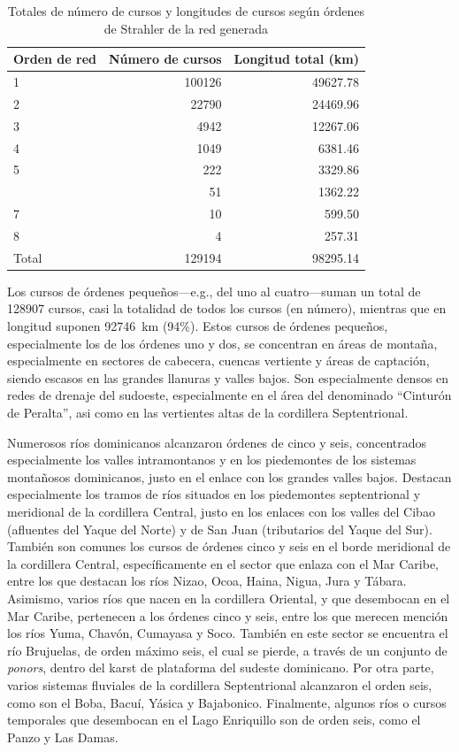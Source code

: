 \documentclass[spanish]{article}
\begin{document}
\begin{table}[H]

\caption{\label{tab:tablaredesordtotales}Totales de número de cursos y longitudes de cursos según órdenes de Strahler de la red generada}
\centering
\begin{tabular}[t]{lrr}
\toprule
Orden de red & Número de cursos & Longitud total (km)\\
\midrule
1 & 100126 & 49627.78\\
2 & 22790 & 24469.96\\
3 & 4942 & 12267.06\\
4 & 1049 & 6381.46\\
5 & 222 & 3329.86\\
\addlinespace
6 & 51 & 1362.22\\
7 & 10 & 599.50\\
8 & 4 & 257.31\\
Total & 129194 & 98295.14\\
\bottomrule
\end{tabular}
\end{table}

Los cursos de órdenes pequeños---e.g., del uno al cuatro---suman un
total de 128907 cursos, casi la totalidad de todos los cursos (en
número), mientras que en longitud suponen 92746~km (94\%). Estos cursos
de órdenes pequeños, especialmente los de los órdenes uno y dos, se
concentran en áreas de montaña, especialmente en sectores de cabecera,
cuencas vertiente y áreas de captación, siendo escasos en las grandes
llanuras y valles bajos. Son especialmente densos en redes de drenaje
del sudoeste, especialmente en el área del denominado ``Cinturón de
Peralta'', asi como en las vertientes altas de la cordillera
Septentrional.

Numerosos ríos dominicanos alcanzaron órdenes de cinco y seis,
concentrados especialmente los valles intramontanos y en los piedemontes
de los sistemas montañosos dominicanos, justo en el enlace con los
grandes valles bajos. Destacan especialmente los tramos de ríos situados
en los piedemontes septentrional y meridional de la cordillera Central,
justo en los enlaces con los valles del Cibao (afluentes del Yaque del
Norte) y de San Juan (tributarios del Yaque del Sur). También son
comunes los cursos de órdenes cinco y seis en el borde meridional de la
cordillera Central, específicamente en el sector que enlaza con el Mar
Caribe, entre los que destacan los ríos Nizao, Ocoa, Haina, Nigua, Jura
y Tábara. Asimismo, varios ríos que nacen en la cordillera Oriental, y
que desembocan en el Mar Caribe, pertenecen a los órdenes cinco y seis,
entre los que merecen mención los ríos Yuma, Chavón, Cumayasa y Soco.
También en este sector se encuentra el río Brujuelas, de orden máximo
seis, el cual se pierde, a través de un conjunto de \emph{ponors},
dentro del karst de plataforma del sudeste dominicano. Por otra parte,
varios sistemas fluviales de la cordillera Septentrional alcanzaron el
orden seis, como son el Boba, Bacuí, Yásica y Bajabonico. Finalmente,
algunos ríos o cursos temporales que desembocan en el Lago Enriquillo
son de orden seis, como el Panzo y Las Damas.
\end{document}
